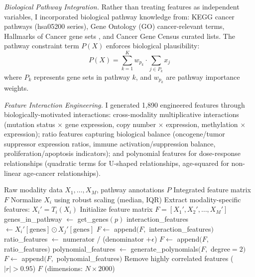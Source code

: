 \documentclass[manuscript, screen, review]{jair}
\begin{document}
\emph{Biological Pathway Integration.} Rather than treating features as independent variables, I incorporated biological pathway knowledge from: KEGG cancer pathways (hsa05200 series), Gene Ontology (GO) cancer-relevant terms, Hallmarks of Cancer gene sets \citep{hanahan2011hallmarks}, and Cancer Gene Census curated lists. The pathway constraint term $P(X)$ enforces biological plausibility:
\begin{equation}
  P(X) = \sum_{k=1}^{K} w_{p_k} \cdot \sum_{j \in P_k} x_j
  \label{eq:pathway}
\end{equation}
where $P_k$ represents gene sets in pathway $k$, and $w_{p_k}$ are pathway importance weights.

\emph{Feature Interaction Engineering.} I generated 1,890 engineered features through biologically-motivated interactions: cross-modality multiplicative interactions (mutation status $\times$ gene expression, copy number $\times$ expression, methylation $\times$ expression); ratio features capturing biological balance (oncogene/tumor suppressor expression ratios, immune activation/suppression balance, proliferation/apoptosis indicators); and polynomial features for dose-response relationships (quadratic terms for U-shaped relationships, age-squared for non-linear age-cancer relationships).

\begin{algorithm}[!t]
\caption{Knowledge-Guided Multi-Modal Feature Integration}
\label{alg:integration}
\begin{algorithmic}[1]
\Require Raw modality data $X_1, \ldots, X_M$, pathway annotations $P$
\Ensure Integrated feature matrix $F$
  \State Normalize $X_i$ using robust scaling (median, IQR)
  \State Extract modality-specific features: $X_i' = T_i(X_i)$
\EndFor
\State Initialize feature matrix $F = [X_1', X_2', \ldots, X_M']$
  \State genes\_in\_pathway $\gets$ get\_genes$(p)$
      \State interaction\_features $\gets X_i'[\text{genes}] \odot X_j'[\text{genes}]$
      \State $F \gets$ append$(F,$ interaction\_features$)$
    \EndIf
  \EndFor
\EndFor
{}
  \State ratio\_features $\gets$ numerator / (denominator $+ \epsilon$)
  \State $F \gets$ append$(F,$ ratio\_features$)$
\EndFor
{}
  \State polynomial\_features $\gets$ generate\_polynomials$(F,$ degree$=2)$
  \State $F \gets$ append$(F,$ polynomial\_features$)$
\EndFor
\State Remove highly correlated features ($|r| > 0.95$)
\State \Return $F$ (dimensions: $N \times 2000$)
\end{algorithmic}
\end{algorithm}
\end{document}
